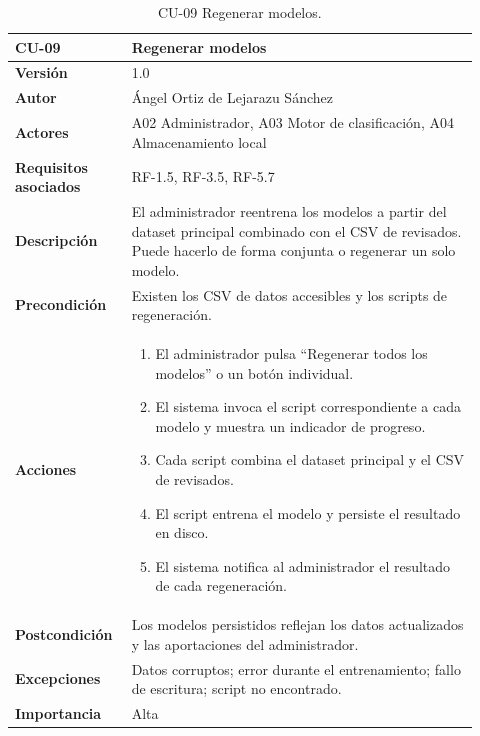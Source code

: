 \begin{table}[H]
	\centering
	\begin{tabular}{ p{0.21\linewidth} p{0.71\linewidth} }
		\toprule
		\textbf{CU-09}    & \textbf{Regenerar modelos}\\
		\toprule
		\textbf{Versión}              & 1.0 \\
		\textbf{Autor}                & Ángel Ortiz de Lejarazu Sánchez \\
		\textbf{Actores}              & A02 Administrador, A03 Motor de clasificación, A04 Almacenamiento local \\
		\textbf{Requisitos asociados} & RF-1.5, RF-3.5, RF-5.7 \\
		\textbf{Descripción}          & El administrador reentrena los modelos a partir del dataset principal combinado con el CSV de revisados. Puede hacerlo de forma conjunta o regenerar un solo modelo. \\
		\textbf{Precondición}         & Existen los CSV de datos accesibles y los scripts de regeneración. \\
		\textbf{Acciones}             &
		\begin{enumerate}
			\def\labelenumi{\arabic{enumi}.}
			\item El administrador pulsa ``Regenerar todos los modelos'' o un botón individual.
			\item El sistema invoca el script correspondiente a cada modelo y muestra un indicador de progreso.
			\item Cada script combina el dataset principal y el CSV de revisados.
			\item El script entrena el modelo y persiste el resultado en disco.
			\item El sistema notifica al administrador el resultado de cada regeneración.
		\end{enumerate} \\
		\textbf{Postcondición}        & Los modelos persistidos reflejan los datos actualizados y las aportaciones del administrador. \\
		\textbf{Excepciones}          & Datos corruptos; error durante el entrenamiento; fallo de escritura; script no encontrado. \\
		\textbf{Importancia}          & Alta \\
		\bottomrule
	\end{tabular}
	\caption{CU-09 Regenerar modelos.}
\end{table}